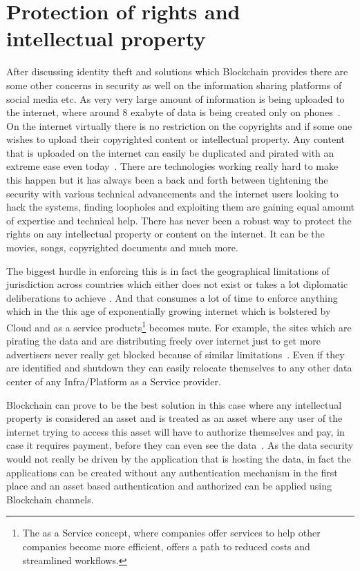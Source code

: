 \section{Protection of rights and intellectual property}

After discussing identity theft and solutions which Blockchain
provides there are some other concerns in security as well on the
information sharing platforms of social media etc. As very very large
amount of information is being uploaded to the internet, where around
8 exabyte of data is being created only on phones~\cite{jeff26}. On
the internet virtually there is no restriction on the copyrights and if
some one wishes to upload their copyrighted content or intellectual
property. Any content that is uploaded on the internet can easily be
duplicated and pirated with an extreme ease even today~\cite{anita27}.
There are technologies working really hard to make this happen but it
has always been a back and forth between tightening the security with
various technical advancements and the internet users looking to hack
the systems, finding loopholes and exploiting them are gaining equal
amount of expertise and technical help. There has never been a robust
way to protect the rights on any intellectual property or content on
the internet. It can be the movies, songs, copyrighted documents and
much more.

The biggest hurdle in enforcing this is in fact the geographical
limitations of jurisdiction across countries which either does not
exist or takes a lot diplomatic deliberations to achieve
\cite{anita27}. And that consumes a lot of time to enforce anything
which in the this age of exponentially growing internet which is
bolstered by Cloud and as a service products\footnote{The as a Service
  concept, where companies offer services to help other companies
  become more efficient, offers a path to reduced costs and
  streamlined workflows.} becomes mute. For example, the sites which
are pirating the data and are distributing freely over internet just
to get more advertisers never really get blocked because of similar
limitations~\cite{ian28}. Even if they are identified and shutdown
they can easily relocate themselves to any other data center of any
Infra/Platform as a Service provider.

Blockchain can prove to be the best solution in this case where any
intellectual property is considered an asset and is treated as an
asset where any user of the internet trying to access this asset will
have to authorize themselves and pay, in case it requires payment,
before they can even see the data~\cite{bitcoinist29}. As the data
security would not really be driven by the application that is hosting
the data, in fact the applications can be created without any
authentication mechanism in the first place and an asset based
authentication and authorized can be applied using Blockchain
channels.


